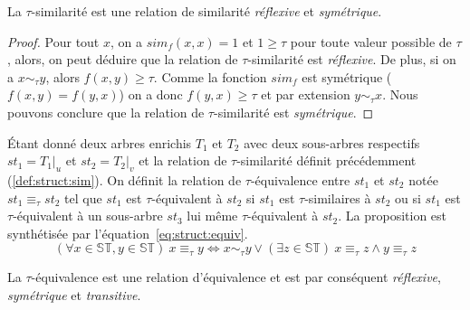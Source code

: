 \begin{proposition}
    La $\tau$-similarité est une relation de similarité \emph{réflexive} et \emph{symétrique}.
\end{proposition}

\begin{proof}
    Pour tout $x$, on a $sim_f(x, x) = 1$ et $1 \ge \tau$ pour toute valeur possible de $\tau$, alors, on peut déduire que la relation de $\tau$-similarité est \emph{réflexive}.
    De plus, si on a $x \sim_\tau y$, alors $f(x, y) \ge \tau$.
    Comme la fonction $sim_f$ est symétrique ($f(x, y) = f(y, x)$) on a donc $f(y, x) \ge \tau$ et par extension $y \sim_\tau x$.
    Nous pouvons conclure que la relation de $\tau$-similarité est \emph{symétrique}.
\end{proof}

\begin{definition}
    \label{def:struct:equiv}
    Étant donné deux arbres enrichis $T_1$ et $T_2$ avec deux sous-arbres respectifs $st_1 = T_1|_u$ et $st_2 = T_2|_v$ et la relation de $\tau$-similarité définit précédemment (\ref{def:struct:sim}).
    On définit la relation de $\tau$-équivalence entre $st_1$ et $st_2$ notée $st_1 \equiv_\tau st_2$ tel que $st_1$ est $\tau$-équivalent à $st_2$ si $st_1$ est $\tau$-similaires à $st_2$ ou si $st_1$ est  $\tau$-équivalent à un sous-arbre $st_3$ lui même $\tau$-équivalent à $st_2$.
    La proposition est synthétisée par l'équation~\ref{eq:struct:equiv}.
    \begin{equation}
        (\forall x \in \mathbb{ST}, y \in \mathbb{ST}) ~ x \equiv_\tau y \iff x \sim_\tau y \lor (\exists z \in \mathbb{ST}) ~ x \equiv_\tau z \land y \equiv_\tau z \label{eq:struct:equiv}
    \end{equation}
\end{definition}

\begin{proposition}
    La $\tau$-équivalence est une relation d'équivalence et est par conséquent \emph{réflexive}, \emph{symétrique} et \emph{transitive}.
\end{proposition}


